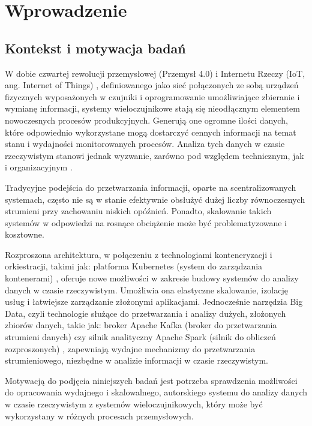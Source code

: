 \section{Wprowadzenie}
\label{sec:wprowadzenie}

\subsection{Kontekst i motywacja badań}
\label{subsec:kontekst}

W dobie czwartej rewolucji przemysłowej (Przemysł 4.0) \cite{przemysl40_iot_ogolnie} i Internetu Rzeczy (IoT, ang. Internet of Things) \cite{iot_definition_aws}, definiowanego jako sieć połączonych ze sobą urządzeń fizycznych wyposażonych w czujniki i oprogramowanie umożliwiające zbieranie i wymianę informacji, systemy wieloczujnikowe stają się nieodłącznym 
elementem nowoczesnych procesów produkcyjnych. Generują one ogromne ilości danych, które odpowiednio wykorzystane mogą dostarczyć
cennych informacji na temat stanu i wydajności monitorowanych procesów. Analiza tych danych w czasie rzeczywistym stanowi jednak
wyzwanie, zarówno pod względem technicznym, jak i organizacyjnym \cite{realtime_challenges}.

Tradycyjne podejścia do przetwarzania informacji, oparte na scentralizowanych systemach, często nie są w stanie efektywnie obsłużyć
dużej liczby równoczesnych strumieni przy zachowaniu niskich opóźnień. Ponadto, skalowanie takich systemów w odpowiedzi na rosnące
obciążenie może być problematyzowane i kosztowne.

Rozproszona architektura, w połączeniu z technologiami konteneryzacji i orkiestracji, takimi jak: platforma Kubernetes (system do zarządzania kontenerami) \cite{kubernetes_benefits},
oferuje nowe możliwości w zakresie budowy systemów do analizy danych w czasie rzeczywistym. Umożliwia ona elastyczne skalowanie,
izolację usług i łatwiejsze zarządzanie złożonymi aplikacjami. Jednocześnie narzędzia Big Data, czyli technologie służące do przetwarzania i analizy dużych, złożonych zbiorów danych, takie jak: broker Apache Kafka (broker do przetwarzania strumieni danych) czy silnik analityczny Apache Spark (silnik do obliczeń rozproszonych) \cite{kafka, spark_streaming}, zapewniają
wydajne mechanizmy do przetwarzania strumieniowego, niezbędne w analizie informacji w czasie rzeczywistym.

Motywacją do podjęcia niniejszych badań jest potrzeba sprawdzenia możliwości do opracowania wydajnego i skalowalnego, autorskiego systemu do
analizy danych w czasie rzeczywistym z systemów wieloczujnikowych, który może być wykorzystany w różnych procesach przemysłowych.

